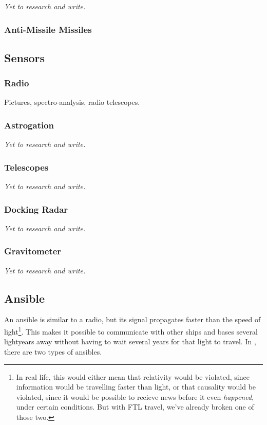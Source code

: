 \textit{Yet to research and write.}

\subsubsection{Anti-Missile Missiles}

\subsection{Sensors}

\subsubsection{Radio}
Pictures, spectro-analysis, radio telescopes.

\subsubsection{Astrogation}

\textit{Yet to research and write.}

\subsubsection{Telescopes}

\textit{Yet to research and write.}

\subsubsection{Docking Radar}

\textit{Yet to research and write.}

\subsubsection{Gravitometer}

\textit{Yet to research and write.}

\subsection{Ansible}
\par
An ansible is similar to a radio, but its signal propagates faster than the speed of light\footnote{In real life, this would either mean that relativity would be violated, since information would be travelling faster than light, or that causality would be violated, since it would be possible to recieve news before it even \textit{happened}, under certain conditions. But with FTL travel, we've already broken one of those two.}. This makes it possible to communicate with other ships and bases several lightyears away without having to wait several years for that light to travel. In \getTitle, there are two types of ansibles.

